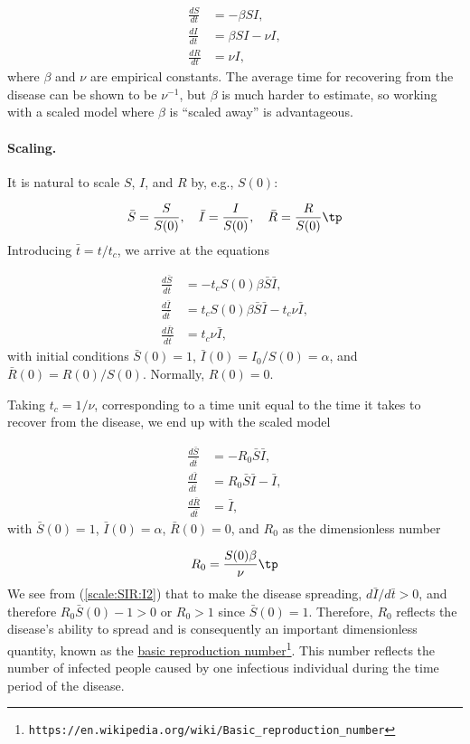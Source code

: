 \documentclass[graybox,envcountchap,sectrefs,final]{svmonodo}
\begin{document}
\begin{align}
\frac{dS}{dt} &= - \beta SI,
\label{scale:SIR:S}\\ 
\frac{dI}{dt} &= \beta SI - \nu I,
\label{scale:SIR:I}\\ 
\frac{dR}{dt} &= \nu I,
\label{scale:SIR:R}
\end{align}
where $\beta$ and $\nu$ are empirical constants. The average time for recovering
from the disease can be shown to be $\nu^{-1}$, but $\beta$ is much harder
to estimate, so working with a scaled model where $\beta$ is ``scaled away''
is advantageous.

\paragraph{Scaling.}
It is natural to scale $S$, $I$, and $R$ by, e.g., $S(0)$:

\[ \bar S = \frac{S}{S(0)},\quad \bar I = \frac{I}{S(0)},\quad
\bar R = \frac{R}{S(0)}\tp
\]
Introducing $\bar t = t/t_c$, we arrive at the equations

\begin{align*}
\frac{d\bar S}{d\bar t} &= - t_c S(0) \beta\bar S\bar I,
\\ 
\frac{d\bar I}{d\bar t} &= t_c S(0) \beta \bar S\bar I - t_c \nu \bar I,
\\ 
\frac{d\bar R}{d\bar t} &= t_c \nu \bar I,
\end{align*}
with initial conditions $\bar S(0)=1$, $\bar I(0)=I_0/S(0)=\alpha$, and
$\bar R(0)=R(0)/S(0)$. Normally, $R(0)=0$.

Taking $t_c=1/\nu$, corresponding to a time unit equal to the time it takes
to recover from the disease, we end up with the scaled model

\begin{align}
\frac{d\bar S}{d\bar t} &= - R_0\bar S\bar I,
\label{scale:SIR:S2}\\ 
\frac{d\bar I}{d\bar t} &= R_0 \bar S\bar I - \bar I,
\label{scale:SIR:I2}\\ 
\frac{d\bar R}{d\bar t} &= \bar I,
\label{scale:SIR:R2}
\end{align}
with $\bar S(0)=1$, $\bar I(0)=\alpha$, $\bar R(0)=0$, and $R_0$ as
the dimensionless number

\begin{equation}
R_0 = \frac{S(0)\beta}{\nu}\tp
\end{equation}
We see from (\ref{scale:SIR:I2}) that to make the disease spreading,
$d\bar I/d\bar t >0$, and therefore $R_0 \bar S(0) - 1 > 0$ or $R_0 > 1$
since $\bar S(0)=1$.
Therefore, $R_0$ reflects the disease's ability to spread and is
consequently an important dimensionless quantity, known as the \href{{https://en.wikipedia.org/wiki/Basic_reproduction_number}}{basic
reproduction number}\footnote{\texttt{https://en.wikipedia.org/wiki/Basic\_reproduction\_number}}.
This number reflects the number of infected people caused by one infectious
individual during the time period of the disease.
\end{document}
